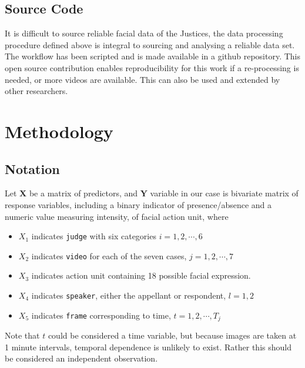 \documentclass{monashthesis}
\begin{document}
\hypertarget{source-code}{%
\section{Source Code}\label{source-code}}

It is difficult to source reliable facial data of the Justices, the data processing procedure defined above is integral to sourcing and analysing a reliable data set. The workflow has been scripted and is made available in a github repository. This open source contribution enables reproducibility for this work if a re-processing is needed, or more videos are available. This can also be used and extended by other researchers.

\let\cleardoublepage\clearpage

\hypertarget{methodology}{%
\chapter{Methodology}\label{methodology}}

\hypertarget{notation}{%
\section{Notation}\label{notation}}

Let \(\mathbf{X}\) be a matrix of predictors, and \(\mathbf{Y}\) variable in our case is bivariate matrix of response variables, including a binary indicator of presence/absence and a numeric value measuring intensity, of facial action unit, where

\begin{itemize}
\tightlist
\item
  \(X_1\) indicates \texttt{judge} with six categories \(i = 1,2, \cdots, 6\)
\item
  \(X_2\) indicates \texttt{video} for each of the seven cases, \(j = 1,2, \cdots, 7\)
\item
  \(X_3\) indicates action unit containing 18 possible facial expression.\\
\item
  \(X_4\) indicates \texttt{speaker}, either the appellant or respondent, \(l=1,2\)
\item
  \(X_5\) indicates \texttt{frame} corresponding to time, \(t = 1,2, \cdots, T_j\)
\end{itemize}

Note that \(t\) could be considered a time variable, but because images are taken at 1 minute intervals, temporal dependence is unlikely to exist. Rather this should be considered an independent observation.
\end{document}
